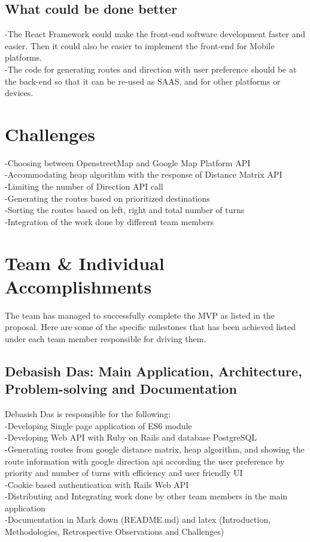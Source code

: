 \documentclass{article}
\begin{document}
\subsection{What could be done better}
-The React Framework could make the front-end software development faster and easier. Then it could also be easier to implement the front-end for Mobile platforms.\\
-The code for generating routes and direction with user preference should be at the back-end so that it can be re-used as SAAS, and for other platforms or devices.\\

\section{Challenges}
-Choosing between OpenstreetMap and Google Map Platform API\\
-Accommodating heap algorithm with the response of Distance Matrix API\\
-Limiting the number of Direction API call\\
-Generating the routes based on prioritized destinations\\
-Sorting the routes based on left, right and total number of turns\\
-Integration of the work done by different team members


\section{Team & Individual Accomplishments}
The team has managed to successfully complete the MVP as listed in the proposal. Here are some of the specific milestones that has been achieved listed under each team member responsible for driving them.

\subsection{Debasish Das: Main Application, Architecture, Problem-solving and Documentation}
Debasish Das is responsible for the following:\\
-Developing Single page application of ES6 module\\
-Developing Web API with Ruby on Rails and database PostgreSQL\\
-Generating routes from google distance matrix, heap algorithm, and showing the route information with google direction api according the user preference by priority and number of turns with efficiency and user friendly UI\\
-Cookie based authentication with Rails Web API\\
-Distributing and Integrating work done by other team members in the main application\\
-Documentation in Mark down (README.md) and latex (Introduction, Methodologies, Retrospective Observations and Challenges)
\end{document}
